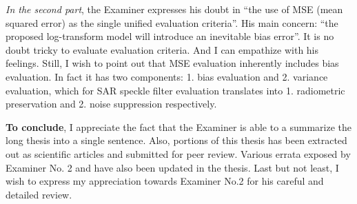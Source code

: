 \textit{In the second part}, the Examiner expresses his doubt in ``the use of MSE (mean squared error) as the single unified evaluation criteria''.
His main concern: ``the proposed log-transform model will introduce an inevitable bias error''.
It is no doubt tricky to evaluate evaluation criteria.
And I can empathize with his feelings.
Still, I wish to point out that MSE evaluation inherently includes bias evaluation. 
In fact it has two components: 1. bias evaluation and 2. variance evaluation, which for SAR speckle filter evaluation translates into 1. radiometric preservation and 2. noise suppression respectively.



\textbf{To conclude}, I appreciate the fact that the Examiner is able to a summarize the long thesis into a single sentence.
Also, portions of this thesis has been extracted out as scientific articles and submitted for peer review.
Various errata exposed by Examiner No. 2 and have also been updated in the thesis.
Last but not least, I wish to express my appreciation towards Examiner No.2 for his careful and detailed review.

%



